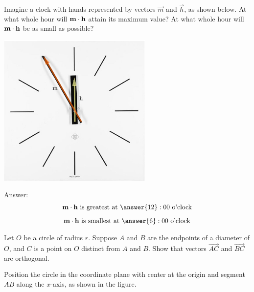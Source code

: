 \documentclass{ximera}
\begin{document}
\begin{problem}
 Imagine a clock with hands represented by vectors $\vec{m}$ and $\vec{h}$, as shown below.
At what whole hour will ${\bf m}\cdot{\bf h}$ attain its maximum value?  At what whole hour will ${\bf m}\cdot{\bf h}$ be as small as possible?

\begin{image}
\includegraphics[height=3in]{clockvectors.jpg}
\end{image}

Answer:$$\vec{m}\dotp\vec{h}\text{ is greatest at }\answer{12}:00 \text{ o'clock}$$
$$\vec{m}\dotp\vec{h}\text{ is smallest at }\answer{6}:00 \text{ o'clock}$$
\end{problem}

\begin{problem} 
Let $O$ be a circle of radius $r$.  Suppose $A$ and $B$ are the endpoints of a diameter of $O$, and $C$ is a point on $O$ distinct from $A$ and $B$. Show that vectors $\overrightarrow{AC}$ and $\overrightarrow{BC}$ are orthogonal.  

\begin{hint}
Position the circle in the coordinate plane with center at the origin and segment $AB$ along the $x$-axis, as shown in the figure.
\end{hint}

\begin{image}[2.5in]
\end{image}
\end{problem}
\end{document}
